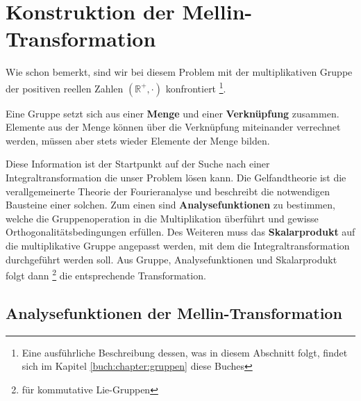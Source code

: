 %
%
%

\section{Konstruktion der Mellin-Transformation
\label{mellin:section:teil2}}
Wie schon bemerkt, sind wir bei diesem Problem mit der multiplikativen 
Gruppe der positiven reellen Zahlen $(\mathbb{R^+},\cdot)$ konfrontiert 
\footnote{Eine ausführliche Beschreibung dessen, was in diesem Abschnitt 
folgt, findet sich im Kapitel \ref{buch:chapter:gruppen} diese Buches}.
\begin{definition}
    Eine Gruppe setzt sich aus einer \textbf{Menge} und einer 
    \textbf{Verknüpfung} zusammen. 
    Elemente aus der Menge können über die Verknüpfung miteinander 
    verrechnet werden, müssen aber stets wieder Elemente der Menge bilden.
\end{definition}
Diese Information ist der Startpunkt auf der Suche nach einer 
Integraltransformation die unser Problem lösen kann.
Die Gelfandtheorie ist die verallgemeinerte Theorie der Fourieranalyse und 
beschreibt die notwendigen Bausteine einer solchen.
Zum einen sind \textbf{Analysefunktionen} zu bestimmen, welche die 
Gruppenoperation in die Multiplikation überführt und gewisse 
Orthogonalitätsbedingungen erfüllen. 
Des Weiteren muss das \textbf{Skalarprodukt} auf die multiplikative Gruppe 
angepasst werden, mit dem die Integraltransformation durchgeführt werden 
soll.
Aus Gruppe, Analysefunktionen und Skalarprodukt folgt dann 
\footnote{für kommutative Lie-Gruppen} die entsprechende Transformation.






\subsection{Analysefunktionen der Mellin-Transformation
\label{mellin:subsection:analysefunktionen}}


